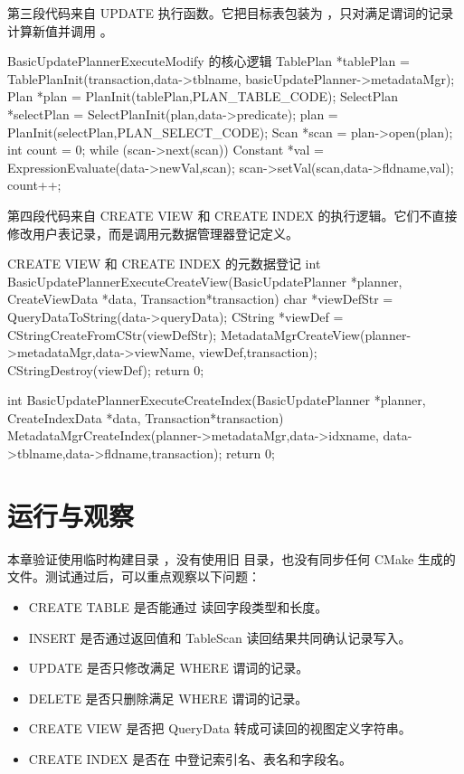 第三段代码来自 UPDATE 执行函数。它把目标表包装为 ，只对满足谓词的记录计算新值并调用 。

\begin{dbcode}{BasicUpdatePlannerExecuteModify 的核心逻辑}
TablePlan *tablePlan = TablePlanInit(transaction,data->tblname,
                                     basicUpdatePlanner->metadataMgr);
Plan *plan = PlanInit(tablePlan,PLAN_TABLE_CODE);
SelectPlan *selectPlan = SelectPlanInit(plan,data->predicate);
plan = PlanInit(selectPlan,PLAN_SELECT_CODE);
Scan *scan = plan->open(plan);
int count = 0;
while (scan->next(scan)){
    Constant *val = ExpressionEvaluate(data->newVal,scan);
    scan->setVal(scan,data->fldname,val);
    count++;
}
\end{dbcode}

第四段代码来自 CREATE VIEW 和 CREATE INDEX 的执行逻辑。它们不直接修改用户表记录，而是调用元数据管理器登记定义。

\begin{dbcode}{CREATE VIEW 和 CREATE INDEX 的元数据登记}
int BasicUpdatePlannerExecuteCreateView(BasicUpdatePlanner *planner,
                                        CreateViewData *data,
                                        Transaction*transaction){
    char *viewDefStr = QueryDataToString(data->queryData);
    CString *viewDef = CStringCreateFromCStr(viewDefStr);
    MetadataMgrCreateView(planner->metadataMgr,data->viewName,
                          viewDef,transaction);
    CStringDestroy(viewDef);
    return 0;
}

int BasicUpdatePlannerExecuteCreateIndex(BasicUpdatePlanner *planner,
                                         CreateIndexData *data,
                                         Transaction*transaction){
    MetadataMgrCreateIndex(planner->metadataMgr,data->idxname,
                           data->tblname,data->fldname,transaction);
    return 0;
}
\end{dbcode}

\section{运行与观察}
\label{sec:update-run-observe}

本章验证使用临时构建目录 ，没有使用旧  目录，也没有同步任何 CMake 生成的  文件。测试通过后，可以重点观察以下问题：

\begin{itemize}
  \item CREATE TABLE 是否能通过  读回字段类型和长度。
  \item INSERT 是否通过返回值和 TableScan 读回结果共同确认记录写入。
  \item UPDATE 是否只修改满足 WHERE 谓词的记录。
  \item DELETE 是否只删除满足 WHERE 谓词的记录。
  \item CREATE VIEW 是否把 QueryData 转成可读回的视图定义字符串。
  \item CREATE INDEX 是否在  中登记索引名、表名和字段名。
\end{itemize}


